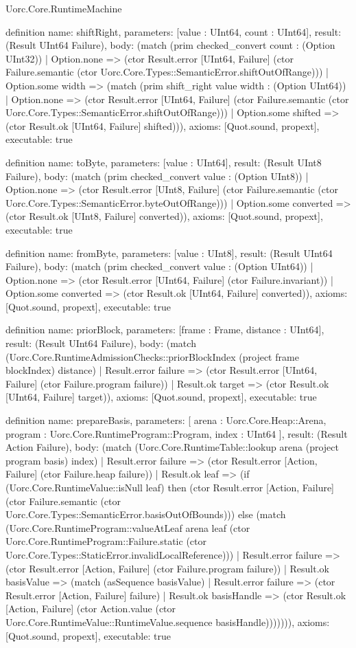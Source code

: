 \begin{lexlean}{Uorc.Core.RuntimeMachine}
\begin{semanticmodule}
definition{
  name: shiftRight,
  parameters: [value : UInt64, count : UInt64],
  result: (Result UInt64 Failure),
  body: (match (prim checked_convert count : (Option UInt32))
    | Option.none => (ctor Result.error [UInt64, Failure] (ctor Failure.semantic (ctor Uorc.Core.Types::SemanticError.shiftOutOfRange)))
    | Option.some width => (match (prim shift_right value width : (Option UInt64))
      | Option.none => (ctor Result.error [UInt64, Failure] (ctor Failure.semantic (ctor Uorc.Core.Types::SemanticError.shiftOutOfRange)))
      | Option.some shifted => (ctor Result.ok [UInt64, Failure] shifted))),
  axioms: [Quot.sound, propext],
  executable: true
}

definition{
  name: toByte,
  parameters: [value : UInt64],
  result: (Result UInt8 Failure),
  body: (match (prim checked_convert value : (Option UInt8))
    | Option.none => (ctor Result.error [UInt8, Failure] (ctor Failure.semantic (ctor Uorc.Core.Types::SemanticError.byteOutOfRange)))
    | Option.some converted => (ctor Result.ok [UInt8, Failure] converted)),
  axioms: [Quot.sound, propext],
  executable: true
}

definition{
  name: fromByte,
  parameters: [value : UInt8],
  result: (Result UInt64 Failure),
  body: (match (prim checked_convert value : (Option UInt64))
    | Option.none => (ctor Result.error [UInt64, Failure] (ctor Failure.invariant))
    | Option.some converted => (ctor Result.ok [UInt64, Failure] converted)),
  axioms: [Quot.sound, propext],
  executable: true
}

definition{
  name: priorBlock,
  parameters: [frame : Frame, distance : UInt64],
  result: (Result UInt64 Failure),
  body: (match (Uorc.Core.RuntimeAdmissionChecks::priorBlockIndex (project frame blockIndex) distance)
    | Result.error failure => (ctor Result.error [UInt64, Failure] (ctor Failure.program failure))
    | Result.ok target => (ctor Result.ok [UInt64, Failure] target)),
  axioms: [Quot.sound, propext],
  executable: true
}

definition{
  name: prepareBasis,
  parameters: [
    arena : Uorc.Core.Heap::Arena,
    program : Uorc.Core.RuntimeProgram::Program,
    index : UInt64
  ],
  result: (Result Action Failure),
  body: (match (Uorc.Core.RuntimeTable::lookup arena (project program basis) index)
    | Result.error failure => (ctor Result.error [Action, Failure] (ctor Failure.heap failure))
    | Result.ok leaf => (if (Uorc.Core.RuntimeValue::isNull leaf) then (ctor Result.error [Action, Failure] (ctor Failure.semantic (ctor Uorc.Core.Types::SemanticError.basisOutOfBounds))) else (match (Uorc.Core.RuntimeProgram::valueAtLeaf arena leaf (ctor Uorc.Core.RuntimeProgram::Failure.static (ctor Uorc.Core.Types::StaticError.invalidLocalReference)))
      | Result.error failure => (ctor Result.error [Action, Failure] (ctor Failure.program failure))
      | Result.ok basisValue => (match (asSequence basisValue)
        | Result.error failure => (ctor Result.error [Action, Failure] failure)
        | Result.ok basisHandle => (ctor Result.ok [Action, Failure] (ctor Action.value (ctor Uorc.Core.RuntimeValue::RuntimeValue.sequence basisHandle))))))),
  axioms: [Quot.sound, propext],
  executable: true
}


\end{semanticmodule}
\end{lexlean}
